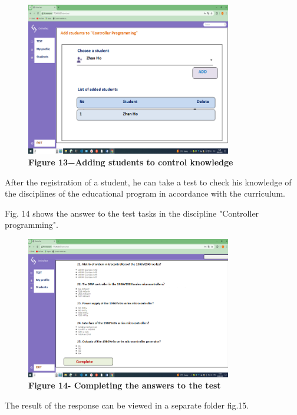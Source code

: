 \begin{figure}[H]
	\centering
	\includegraphics[width=0.8\textwidth]{assets/138}
	\caption*{\bfseries Figure 13−Adding students to control knowledge}
\end{figure}


After the registration of a student, he can take a test to check his
knowledge of the disciplines of the educational program in accordance
with the curriculum.

Fig. 14 shows the answer to the test tasks in the discipline "Controller
programming".

\begin{figure}[H]
	\centering
	\includegraphics[width=0.8\textwidth]{assets/139}
	\caption*{\bfseries Figure 14- Completing the answers to the test}
\end{figure}


The result of the response can be viewed in a separate folder fig.15.

